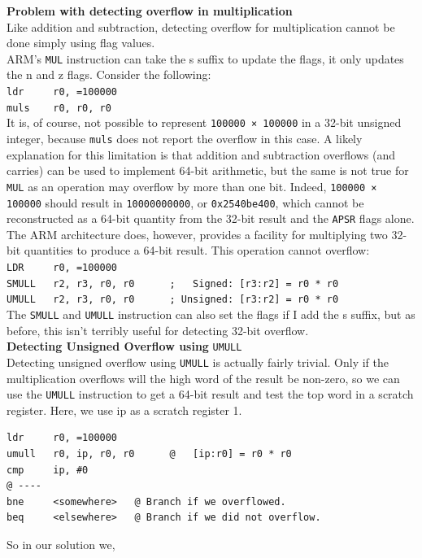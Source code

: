 \documentclass[footheight=20pt, footsepline, headheight=20pt, headsepline]{scrartcl}
\begin{document}
\textbf{Problem with detecting overflow in multiplication}\\
Like addition and subtraction, detecting overflow for multiplication cannot be done simply using flag values. \\ ARM's \verb|MUL| instruction can take the s suffix to update the flags, it only updates the n and z flags. Consider the following:\\
\verb|ldr     r0, =100000|\\
\verb|muls    r0, r0, r0|\\
It is, of course, not possible to represent \verb|100000 × 100000| in a 32-bit unsigned integer, because \verb|muls| does not report the overflow in this case. A likely explanation for this limitation is that addition and subtraction overflows (and carries) can be used to implement 64-bit arithmetic, but the same is not true for \verb|MUL| as an operation may overflow by more than one bit. Indeed, \verb|100000 × 100000| should result in \verb|10000000000|, or \verb|0x2540be400|, which cannot be reconstructed as a 64-bit quantity from the 32-bit result and the \verb|APSR| flags alone.\\
The ARM architecture does, however, provides a facility for multiplying two 32-bit quantities to produce a 64-bit result. This operation cannot overflow:\\
\verb|LDR     r0, =100000|\\
\verb|SMULL   r2, r3, r0, r0      ;   Signed: [r3:r2] = r0 * r0|\\
\verb|UMULL   r2, r3, r0, r0      ; Unsigned: [r3:r2] = r0 * r0|\\
The \verb|SMULL| and \verb|UMULL| instruction can also set the flags if I add the s suffix, but as before, this isn't terribly useful for detecting 32-bit overflow.\\
\textbf{Detecting Unsigned Overflow using} \verb|UMULL|\\
Detecting unsigned overflow using \verb|UMULL| is actually fairly trivial. Only if the multiplication overflows will the high word of the result be non-zero, so we can use the \verb|UMULL| instruction to get a 64-bit result and test the top word in a scratch register. Here, we use ip as a scratch register 1.
\begin{verbatim}
ldr     r0, =100000
umull   r0, ip, r0, r0      @   [ip:r0] = r0 * r0
cmp     ip, #0
@ ----
bne     <somewhere>   @ Branch if we overflowed.
beq     <elsewhere>   @ Branch if we did not overflow.
\end{verbatim}
So in our solution we,
\end{document}

